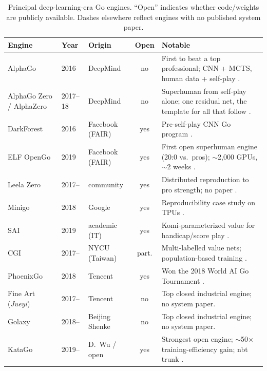 \documentclass[11pt]{article}
\begin{document}
\begin{table}[ht]
\centering
\footnotesize
\renewcommand{\arraystretch}{1.2}
\begin{tabular}{@{}l l l c p{6.0cm}@{}}
\hline
\textbf{Engine} & \textbf{Year} & \textbf{Origin} & \textbf{Open} & \textbf{Notable} \\
\hline
AlphaGo            & 2016    & DeepMind        & no  & First to beat a top professional; CNN + MCTS, human data + self-play \cite{alphago2016}. \\
AlphaGo Zero / AlphaZero & 2017--18 & DeepMind  & no  & Superhuman from self-play alone; one residual net, the template for all that follow \cite{alphagozero2017,alphazero2018}. \\
DarkForest         & 2016    & Facebook (FAIR) & yes & Pre-self-play CNN Go program \cite{darkforest2016}. \\
ELF OpenGo         & 2019    & Facebook (FAIR) & yes & First open superhuman engine (20:0 vs.\ pros); $\sim$2{,}000 GPUs, $\sim$2 weeks \cite{elfopengo2019}. \\
Leela Zero         & 2017--  & community       & yes & Distributed reproduction to pro strength; no paper \cite{leelazero}. \\
Minigo             & 2018    & Google          & yes & Reproducibility case study on TPUs \cite{minigo2019}. \\
SAI                & 2019    & academic (IT)   & yes & Komi-parameterized value for handicap/score play \cite{sai2019}. \\
CGI                & 2017--  & NYCU (Taiwan)   & part. & Multi-labelled value nets; population-based training \cite{multilabel2018,pbt2020}. \\
PhoenixGo          & 2018    & Tencent         & yes & Won the 2018 World AI Go Tournament \cite{phoenixgo}. \\
Fine Art (\emph{Jueyi}) & 2017-- & Tencent     & no  & Top closed industrial engine; no system paper. \\
Golaxy             & 2018--  & Beijing Shenke  & no  & Top closed industrial engine; no system paper. \\
KataGo             & 2019--  & D.\ Wu / open   & yes & Strongest open engine; $\sim$50$\times$ training-efficiency gain; nbt trunk \cite{katago2019}. \\
\hline
\end{tabular}
\caption{Principal deep-learning-era Go engines. ``Open'' indicates whether code/weights are
publicly available. Dashes elsewhere reflect engines with no published system paper.}
\label{tab:engines}
\end{table}
\end{document}
